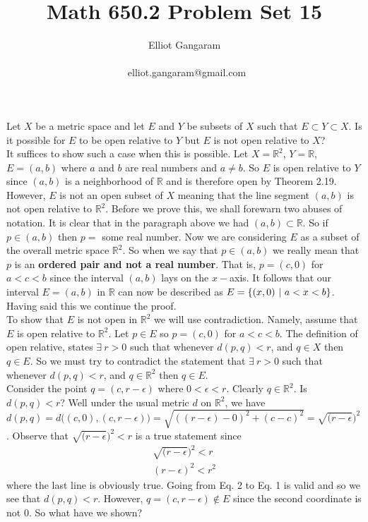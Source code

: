 \documentclass[12pt]{article}
\title{Math 650.2  Problem Set 15}
\author{Elliot Gangaram\\
\date{}
\ elliot.gangaram@gmail.com \\}
\begin{document}
\maketitle


\problem Let $X$ be a metric space and let $E$ and $Y$ be subsets of $X$ such that $E \subset Y \subset X$. Is it possible for $E$ to be open relative to $Y$ but $E$ is not  open relative to $X$? \\ 

It suffices to show such a case when this is possible. Let $X = \mathbb{R}^{2}$, $Y=\mathbb{R}$,  $E=(a,b)$ where $a$ and $b$ are real numbers and $a \neq b$. So $E$ is open relative to $Y$ since $(a,b)$ is a neighborhood of $\mathbb{R}$ and is therefore open by Theorem 2.19.  \\

However, $E$ is not an open subset of $X$ meaning that the line segment $(a,b)$ is not open relative to $\mathbb{R}^{2}$. Before we prove this, we shall forewarn two abuses of notation. It is clear that in the paragraph above we had $(a,b) \subset \mathbb{R}$. So if $p \in (a,b)$ then $p=$ some real number. Now we are considering $E$ as a subset of the overall metric space $\mathbb{R}^{2}$. So when we say that $p \in (a,b)$ we really mean that $p$ is an \textbf{ordered pair and not a real number}. That is, $p=(c,0)$ for $a <c<b$ since the interval $(a,b)$ lays on the $x-$axis. It follows that our interval $E=(a,b)$ in $\mathbb{R}$ can now be described as $E = \left\{(x,0)~|~a<x<b\right\}$. Having said this we continue the proof. \\

To show that $E$ is not open in $\mathbb{R}^{2}$ we will use contradiction. Namely, assume that $E$ is open relative to $\mathbb{R}^{2}$. Let $p \in E$ so $p=(c,0)$ for $a <c<b$. The definition of open relative, states  $\exists~ r>0$ such that whenever $d(p,q)<r$, and $q \in X$ then $q \in E$. So we must try to contradict the statement that $\exists ~r>0$ such that whenever $d(p,q)<r$, and $q \in \mathbb{R}^{2}$ then $q \in E$. \\ 

Consider the point $q=(c,r-\epsilon)$ where $0<\epsilon<r$. Clearly $q \in \mathbb{R}^{2}$. Is $d(p,q)<r$? Well under the usual  metric $d$ on $\mathbb{R}^{2}$, we have $d(p,q)=d \big((c,0),(c,r- \epsilon)\big) = \sqrt{((r-\epsilon)-0)^{2}+(c-c)^{2}} = \sqrt{(r-\epsilon})^{2}$. Observe that $\sqrt{(r-\epsilon})^{2} < r$ is a true statement since
\begin{align}
\sqrt{(r-\epsilon})^{2} < r \\
(r - \epsilon)^{2} < r^{2}
\end{align} where the last line is obviously true. Going from Eq. 2 to Eq. 1 is valid and so we see that $d(p,q) <r$. However, $q=(c,r-\epsilon) \notin E$ since the second coordinate is not 0. So what have we shown? \\ 
\end{document}
